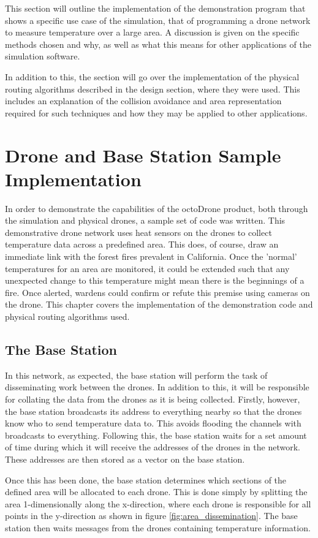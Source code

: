 This section will outline the implementation of the demonstration program that shows a specific use case of the simulation, that of programming a drone network to measure temperature over a large area. A discussion is given on the specific methods chosen and why, as well as what this means for other applications of the simulation software.

In addition to this, the section will go over the implementation of the physical routing algorithms described in the design section, where they were used. This includes an explanation of the collision avoidance and area representation required for such techniques and how they may be applied to other applications.

\section{Drone and Base Station Sample Implementation}
In order to demonstrate the capabilities of the octoDrone product, both through the simulation and physical drones, a sample set of code was written. This demonstrative drone network uses heat sensors on the drones to collect temperature data across a predefined area. This does, of course, draw an immediate link with the forest fires prevalent in California. Once the 'normal' temperatures for an area are monitored, it could be extended such that any unexpected change to this temperature might mean there is the beginnings of a fire. Once alerted, wardens could confirm or refute this premise using cameras on the drone. This chapter covers the implementation of the demonstration code and physical routing algorithms used.

\subsection{The Base Station}
In this network, as expected, the base station will perform the task of disseminating work between the drones. In addition to this, it will be responsible for collating the data from the drones as it is being collected. Firstly, however, the base station broadcasts its address to everything nearby so that the drones know who to send temperature data to. This avoids flooding the channels with broadcasts to everything. Following this, the base station waits for a set amount of time during which it will receive the addresses of the drones in the network. These addresses are then stored as a vector on the base station.

Once this has been done, the base station determines which sections of the defined area will be allocated to each drone. This is done simply by splitting the area 1-dimensionally along the x-direction, where each drone is responsible for all points in the y-direction as shown in figure \ref{fig:area_dissemination}. The base station then waits messages from the drones containing temperature information.

